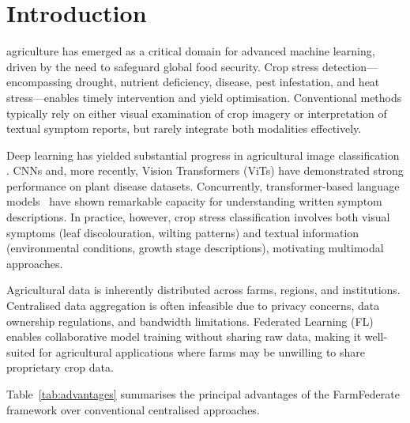 \documentclass[conference]{IEEEtran}
\begin{document}
\section{Introduction}

 agriculture has emerged as a critical domain for advanced
machine learning, driven by the need to safeguard global food security.
Crop stress detection---encompassing drought, nutrient deficiency, disease, pest
infestation, and heat stress---enables timely intervention and yield optimisation.
Conventional methods typically rely on either visual examination of crop imagery or
interpretation of textual symptom reports, but rarely integrate both modalities
effectively.

Deep learning has yielded substantial progress in agricultural image classification
\cite{Mohanty2016}. CNNs and, more recently, Vision Transformers (ViTs) have demonstrated
strong performance on plant disease datasets. Concurrently, transformer-based language
models~\cite{Devlin2019} have shown remarkable capacity for understanding written symptom
descriptions.
In practice, however, crop stress classification involves both visual symptoms (leaf
discolouration, wilting patterns) and textual information (environmental conditions,
growth stage descriptions), motivating multimodal approaches.

Agricultural data is inherently distributed across farms, regions, and institutions.
Centralised data aggregation is often infeasible due to privacy concerns, data ownership
regulations, and bandwidth limitations. Federated Learning (FL)~\cite{McMahan2017}
enables collaborative model training without sharing raw data, making it well-suited for
agricultural applications where farms may be unwilling to share proprietary crop data.

Table~\ref{tab:advantages} summarises the principal advantages of the FarmFederate
framework over conventional centralised approaches.
\end{document}

